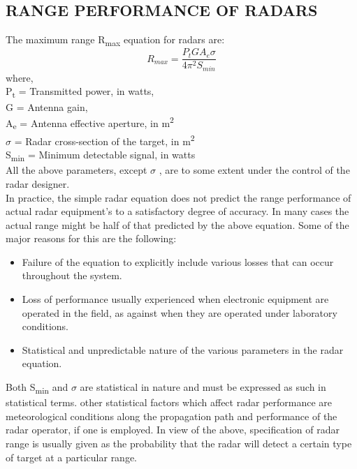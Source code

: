 \documentclass[14pt]{article} %
\begin{document}
\subsection{RANGE PERFORMANCE OF RADARS}
\noindent The maximum range R\textsubscript{max} equation for radars are:
\[R_{max} = \dfrac{P_tGA_e\sigma}{4\pi^{2}S_{min}} \]
where, \\ \indent P\textsubscript{t} = Transmitted power, in watts,
              \\ \indent G = Antenna gain,
              \\ \indent A\textsubscript{e} = Antenna effective aperture, in m\textsuperscript{2}
                         \\ \indent $\sigma$ =  Radar cross-section of the target, in m\textsuperscript{2}
              \\ \indent S\textsubscript{min} =  Minimum detectable signal, in watts\\
All the above parameters, except $\sigma$  , are to some extent under the control of the radar designer.
\\ In practice, the simple radar equation does not predict the range performance of actual radar equipment’s to a satisfactory degree of accuracy.
 In many cases the actual range might be half of that predicted by the above equation. Some of the major reasons for this are the following:
\begin{itemize} 
\item  Failure of the equation to explicitly include various losses that can occur throughout the system.
\item Loss of performance usually experienced when electronic equipment are operated in the field, as against when they are operated under laboratory conditions.
\item Statistical and unpredictable nature of the various parameters in the radar equation.
\end{itemize}
Both S\textsubscript{min} and $\sigma$ are statistical in nature and must be expressed as such in statistical terms. other statistical factors which affect radar performance are meteorological conditions along the propagation path and performance of the radar operator, if one is employed.
In view of the above, specification of radar range is usually given as the probability that the radar will detect a certain type of target at a particular range.
\end{document}
